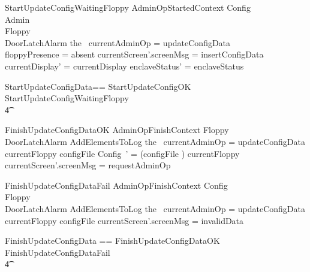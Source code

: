 \begin{schema}{StartUpdateConfigWaitingFloppy}
        AdminOpStartedContext
\also   
        \Xi Config
\\      \Xi Admin 
\\      \Xi Floppy    
\\      \Xi DoorLatchAlarm
\where
        the~ currentAdminOp = updateConfigData
\\      floppyPresence = absent
\also
        currentScreen'.screenMsg = insertConfigData
\\      currentDisplay' = currentDisplay
\also
        enclaveStatus' = enclaveStatus
\end{schema}

\begin{zed}
        StartUpdateConfigData== StartUpdateConfigOK  
         \lor StartUpdateConfigWaitingFloppy
\\ \t4  \lor
        [~ BadAdminLogout | enclaveStatus = waitingStartAdminOp 
\\ \t6  \land the~ currentAdminOp = updateConfigData      ~]
\end{zed}

\begin{schema}{FinishUpdateConfigDataOK}
        AdminOpFinishContext
\also
        \Xi Floppy
\\      \Xi DoorLatchAlarm
\also
        AddElementsToLog
\where
        the~ currentAdminOp = updateConfigData
\also        
        currentFloppy \in \ran configFile
\also
        \theta Config~' = (configFile \inv) currentFloppy
\also
        currentScreen'.screenMsg = requestAdminOp
\end{schema}

\begin{schema}{FinishUpdateConfigDataFail}
        AdminOpFinishContext
\also
        \Xi Config
\\      \Xi Floppy
\\      \Xi DoorLatchAlarm
\also
        AddElementsToLog
\where
        the~ currentAdminOp = updateConfigData
\also        
        currentFloppy \notin \ran configFile
\also
        currentScreen'.screenMsg = invalidData
\end{schema}

\begin{zed}
        FinishUpdateConfigData == FinishUpdateConfigDataOK \lor
        FinishUpdateConfigDataFail
\\ \t4  \lor
        [~ BadAdminLogout | enclaveStatus = waitingFinishAdminOp 
\\ \t6  \land the~ currentAdminOp = updateConfigData      ~]
\end{zed}


